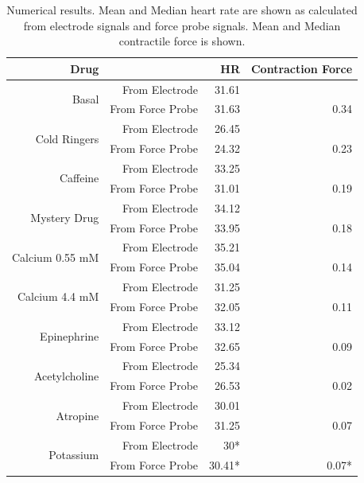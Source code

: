 \documentclass[12pt]{article}
\begin{document}

\begin{table}[H]
	\centering
	\caption{Numerical results. Mean and Median heart rate are shown as calculated from electrode signals and force probe signals. Mean and Median contractile force is shown.}\label{tab:stats}
	\begin{tabular}{|r r|r|r|}
		\hline
		Drug&&HR & Contraction Force \\
		\hline
		\multirow{2}{*}{Basal}
		&From Electrode & 31.61 &  \\
		&From Force Probe & 31.63 & 0.34 \\
		\hline
		\multirow{2}{*}{Cold Ringers}
		&From Electrode & 26.45&   \\
		&From Force Probe & 24.32 & 0.23 \\
		\hline
		\multirow{2}{*}{Caffeine}
		&From Electrode & 33.25&   \\
		&From Force Probe & 31.01& 0.19 \\
		\hline
		\multirow{2}{*}{Mystery Drug}
		&From Electrode & 34.12 &   \\
		&From Force Probe &33.95 & 0.18  \\
		\hline
		\multirow{2}{*}{Calcium 0.55 mM}
		&From Electrode & 35.21 & \\
		&From Force Probe & 35.04 & 0.14 \\
		\hline
		
		\multirow{2}{*}{Calcium 4.4 mM}
		&From Electrode & 31.25 &   \\
		&From Force Probe & 32.05 & 0.11  \\
		\hline
		
		\multirow{2}{*}{Epinephrine }
		&From Electrode & 33.12 &  \\
		&From Force Probe & 32.65 & 0.09 \\
		\hline
		
		\multirow{2}{*}{Acetylcholine}
		&From Electrode & 25.34 &  \\
		&From Force Probe & 26.53 & 0.02  \\
		\hline
		
		\multirow{2}{*}{Atropine}
		&From Electrode & 30.01 &   \\
		&From Force Probe & 31.25 & 0.07 \\
		\hline
		
		\multirow{2}{*}{Potassium}
		&From Electrode & 30* &   \\
		&From Force Probe & 30.41* & 0.07*  \\
		\hline
		
	\end{tabular}
\end{table}
\end{document}
